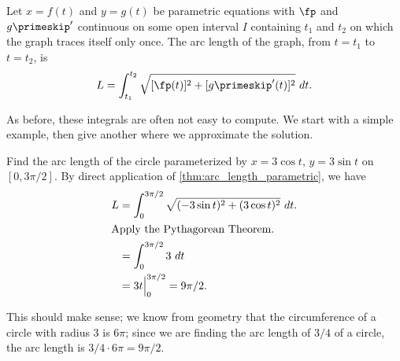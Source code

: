 \begin{theorem}\label{thm:arc_length_parametric}
Let $x=f(t)$ and $y=g(t)$ be parametric equations with $\fp$ and $g\primeskip'$ continuous on some open interval $I$ containing $t_1$ and $t_2$ on which the graph traces itself only once. The arc length of the graph, from $t=t_1$ to $t=t_2$, is
\[L = \int_{t_1}^{t_2} \sqrt{[\fp(t)]^2+[g\primeskip'(t)]^2}\ dt.\]
\end{theorem}

As before, these integrals are often not easy to compute. We start with a simple example, then give  another where we approximate the solution.

\begin{example}\label{ex_parcalc6}
Find the arc length of the circle parameterized by $x=3\cos t$, $y=3\sin t$ on $[0,3\pi/2]$. 
\solution
By direct application of \autoref{thm:arc_length_parametric}, we have
\begin{align*}
L &= \int_0^{3\pi/2} \sqrt{(-3\sin t)^2 +(3\cos t)^2} \ dt.\\
\intertext{Apply the Pythagorean Theorem.}
	&= \int_0^{3\pi/2} 3 \ dt\\
	&= 3t\Big|_0^{3\pi/2} = 9\pi/2.
	\end{align*}
	
This should make sense; we know from geometry that the circumference of a circle with radius 3 is $6\pi$; since we are finding the arc length of $3/4$ of a circle, the arc length is $3/4\cdot 6\pi = 9\pi/2$.
\end{example}


